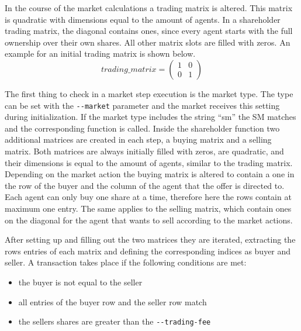 In the course of the market calculations a trading matrix is altered. This matrix is quadratic with dimensions equal to the amount of agents. In a shareholder trading matrix, the diagonal contains ones, since every agent starts with the full ownership over their own shares. All other matrix slots are filled with zeros. An example for an initial trading matrix is shown below.
\begin{equation*}
trading\_matrix = 
\begin{pmatrix}
1 & 0 \\
0 & 1
\end{pmatrix}
\end{equation*}

The first thing to check in a market step execution is the market type. The type can be set with the \verb|--market| parameter and the market receives this setting during initialization. If the market type includes the string ``sm'' the SM matches and the corresponding function is called. 
Inside the shareholder function two additional matrices are created in each step, a buying matrix and a selling matrix. Both matrices are always initially filled with zeros, are quadratic, and their dimensions is equal to the amount of agents, similar to the trading matrix. Depending on the market action the buying matrix is altered to contain a one in the row of the buyer and the column of the agent that the offer is directed to.
Each agent can only buy one share at a time, therefore here the rows contain at maximum one entry. The same applies to the selling matrix, which contain ones on the diagonal for the agent that wants to sell according to the market actions.

After setting up and filling out the two matrices they are iterated, extracting the rows entries of each matrix and defining the corresponding indices as buyer and seller. A transaction takes place if the following conditions are met:
\begin{itemize}
    \item the buyer is not equal to the seller
    \item all entries of the buyer row and the seller row match
    \item the sellers shares are greater than the \verb|--trading-fee|
\end{itemize}

